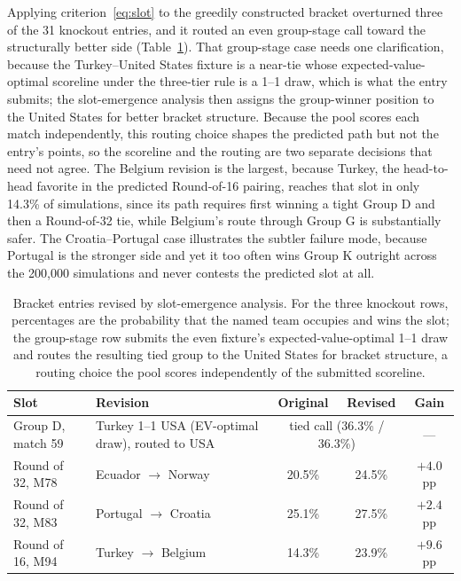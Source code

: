 \documentclass[11pt,letterpaper]{article}
\begin{document}
Applying criterion~\eqref{eq:slot} to the greedily constructed bracket overturned three of the 31 knockout entries, and it routed an even group-stage call toward the structurally better side (Table~\ref{tab:revisions}). That group-stage case needs one clarification, because the Turkey--United States fixture is a near-tie whose expected-value-optimal scoreline under the three-tier rule is a 1--1 draw, which is what the entry submits; the slot-emergence analysis then assigns the group-winner position to the United States for better bracket structure. Because the pool scores each match independently, this routing choice shapes the predicted path but not the entry's points, so the scoreline and the routing are two separate decisions that need not agree. The Belgium revision is the largest, because Turkey, the head-to-head favorite in the predicted Round-of-16 pairing, reaches that slot in only 14.3\% of simulations, since its path requires first winning a tight Group D and then a Round-of-32 tie, while Belgium's route through Group G is substantially safer. The Croatia--Portugal case illustrates the subtler failure mode, because Portugal is the stronger side and yet it too often wins Group K outright across the 200{,}000 simulations and never contests the predicted slot at all.

\begin{table}[ht]
\centering\small
\caption{Bracket entries revised by slot-emergence analysis. For the three knockout rows, percentages are the probability that the named team occupies and wins the slot; the group-stage row submits the even fixture's expected-value-optimal 1--1 draw and routes the resulting tied group to the United States for bracket structure, a routing choice the pool scores independently of the submitted scoreline.}
\label{tab:revisions}
\begin{tabular}{llccc}
\toprule
Slot & Revision & Original & Revised & Gain \\
\midrule
Group D, match 59 & Turkey 1--1 USA (EV-optimal draw), routed to USA & \multicolumn{2}{c}{tied call (36.3\% / 36.3\%)} & --- \\
Round of 32, M78 & Ecuador $\to$ Norway & 20.5\% & 24.5\% & $+4.0$ pp \\
Round of 32, M83 & Portugal $\to$ Croatia & 25.1\% & 27.5\% & $+2.4$ pp \\
Round of 16, M94 & Turkey $\to$ Belgium & 14.3\% & 23.9\% & $+9.6$ pp \\
\bottomrule
\end{tabular}
\end{table}
\end{document}
